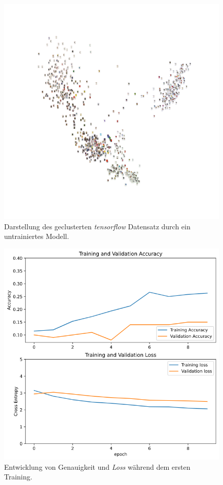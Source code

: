 \documentclass[a4paper,12pt,ngerman]{article}
\begin{document}
\newpage
\begin{figure}[ht]
\includegraphics[width=\linewidth]{image_cluster_untrained}
\centering
\caption{Darstellung des geclusterten \textit{tensorflow} Datensatz durch ein untrainiertes Modell.}
\end{figure}

\newpage
\begin{figure}[ht]
\includegraphics[width=\linewidth]{first_training}
\centering
\caption{Entwicklung von Genauigkeit und \textit{Loss} während dem ersten Training.}
\end{figure}
\end{document}
